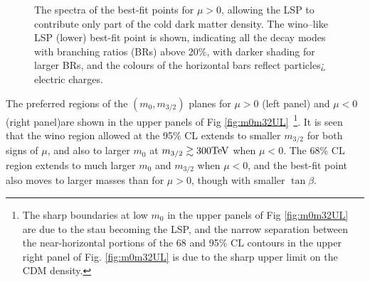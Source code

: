 \begin{figure}[htb!]
\begin{center}
\end{center}
\vspace{-0.5cm}
\caption{The spectra of the best-fit points for $\mu > 0$, allowing the LSP to contribute only part of the cold dark matter density. The wino--like LSP (lower) best-fit point is shown, indicating all the decay modes with branching ratios (BRs) above 20\%, with darker shading for larger BRs, and the colours of the horizontal bars reflect particles¿ electric charges.}
\label{fig:spectrumno}
\end{figure}

The preferred regions of the $(m_0, m_{3/2})$ planes for $\mu > 0$ (left panel) and $\mu < 0$ (right panel)are shown in  the upper panels of Fig \ref{fig:m0m32UL}~\footnote{{The sharp boundaries at low $m_0$ in the upper panels of Fig \ref{fig:m0m32UL} are due to the stau becoming {the LSP}, and the narrow separation between the near-horizontal portions of the 68 and 95\% CL contours
in the upper right panel of Fig. \ref{fig:m0m32UL} is due to the sharp upper limit on the CDM density.}}. 
It is seen that the wino region allowed at the 95\% CL extends to smaller $m_{3/2}$ for both signs of $\mu$, and also to larger $m_0$ at $m_{3/2} \gtrsim 300 \rm TeV$ when $\mu < 0$. The 68\% CL region extends to much larger $m_0$ and $m_{3/2}$
when $\mu < 0$, and the best-fit point also moves to larger masses than for $\mu > 0$, {though with smaller $\tan{\beta}$}.

